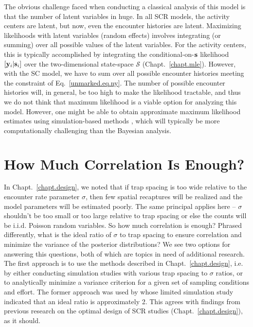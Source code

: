 The obvious challenge faced when conducting a classical analysis of
this model is that the number of latent variables in huge. In all SCR models, the activity centers are
latent, but now, even the encounter histories are latent.
Maximizing likelihoods with latent variables (random effects) involves
integrating (or summing) over all possible values of the latent
variables. For the activity centers, this is typically accomplished by
integrating the conditional-on-$\bf s$ likelihood $[{\bf y}_i|{\bf s}_i]$ over the two-dimensional
state-space $\mathcal{S}$ (Chapt.~\ref{chapt.mle}). However, with
the SC model, we have to sum
over all possible encounter histories %
meeting the constraint of Eq.~\ref{unmarked.eq.ny}. The
number of possible encounter histories
will, in general, be too high to make the likelihood tractable,
and thus we do not think that maximum likelihood is a viable option
for analyzing this model. However, one might be able to obtain
approximate maximum likelihood estimates using simulation-based methods
\citep{lele_etal:2010}, which will typically be more computationally
challenging than the Bayesian analysis.



\section{How Much Correlation Is Enough?}
In Chapt.~\ref{chapt.design}, we noted that if trap spacing is too
wide relative to the encounter rate parameter $\sigma$, then few
spatial recaptures will be realized and the model parameters will be
estimated poorly. The same principal applies here --
$\sigma$ shouldn't be too small or too large relative to trap
spacing or else the counts will be i.i.d. Poisson random variables. So
how much correlation is enough? Phrased differently, what is the ideal
ratio of $\sigma$ to trap spacing to ensure correlation and minimize
the variance of the posterior distributions? We see two options for
answering this questions, both of which are topics in need of
additional research. The first approach is to use the methods
described in Chapt.~\ref{chapt.design}, i.e. by either conducting
simulation studies with various trap spacing to $\sigma$ ratios, or to
analytically minimize a variance criterion for a given set of
sampling conditions and effort. The former approach was used by
\citet{chandler_royle:2012} whose limited simulation study indicated
that an ideal ratio is approximately 2. This agrees with
findings from previous research on the optimal design of SCR studies
(Chapt.~\ref{chapt.design}), as it should.

